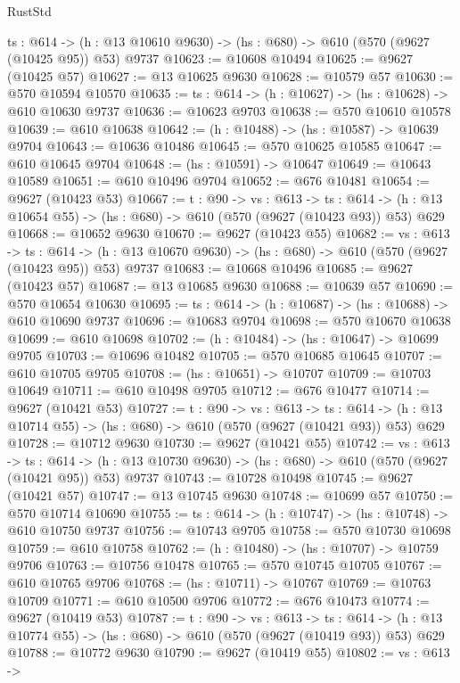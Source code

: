 \begin{lexlean}{RustStd}
\begin{coremodule}
  {ts : @614} -> (h : @13 @10610 @9630) -> (hs : @680) -> @610 (@570 (@9627 (@10425 @95)) @53) @9737
@10623 := @10608 @10494
@10625 := @9627 (@10425 @57)
@10627 := @13 @10625 @9630
@10628 := @10579 @57
@10630 := @570 @10594 @10570
@10635 := {ts : @614} -> (h : @10627) -> (hs : @10628) -> @610 @10630 @9737
@10636 := @10623 @9703
@10638 := @570 @10610 @10578
@10639 := @610 @10638
@10642 := (h : @10488) -> (hs : @10587) -> @10639 @9704
@10643 := @10636 @10486
@10645 := @570 @10625 @10585
@10647 := @610 @10645 @9704
@10648 := (hs : @10591) -> @10647
@10649 := @10643 @10589
@10651 := @610 @10496 @9704
@10652 := @676 @10481
@10654 := @9627 (@10423 @53)
@10667 := {t : @90} ->
  {vs : @613} ->
  {ts : @614} -> (h : @13 @10654 @55) -> (hs : @680) -> @610 (@570 (@9627 (@10423 @93)) @53) @629
@10668 := @10652 @9630
@10670 := @9627 (@10423 @55)
@10682 := {vs : @613} ->
  {ts : @614} -> (h : @13 @10670 @9630) -> (hs : @680) -> @610 (@570 (@9627 (@10423 @95)) @53) @9737
@10683 := @10668 @10496
@10685 := @9627 (@10423 @57)
@10687 := @13 @10685 @9630
@10688 := @10639 @57
@10690 := @570 @10654 @10630
@10695 := {ts : @614} -> (h : @10687) -> (hs : @10688) -> @610 @10690 @9737
@10696 := @10683 @9704
@10698 := @570 @10670 @10638
@10699 := @610 @10698
@10702 := (h : @10484) -> (hs : @10647) -> @10699 @9705
@10703 := @10696 @10482
@10705 := @570 @10685 @10645
@10707 := @610 @10705 @9705
@10708 := (hs : @10651) -> @10707
@10709 := @10703 @10649
@10711 := @610 @10498 @9705
@10712 := @676 @10477
@10714 := @9627 (@10421 @53)
@10727 := {t : @90} ->
  {vs : @613} ->
  {ts : @614} -> (h : @13 @10714 @55) -> (hs : @680) -> @610 (@570 (@9627 (@10421 @93)) @53) @629
@10728 := @10712 @9630
@10730 := @9627 (@10421 @55)
@10742 := {vs : @613} ->
  {ts : @614} -> (h : @13 @10730 @9630) -> (hs : @680) -> @610 (@570 (@9627 (@10421 @95)) @53) @9737
@10743 := @10728 @10498
@10745 := @9627 (@10421 @57)
@10747 := @13 @10745 @9630
@10748 := @10699 @57
@10750 := @570 @10714 @10690
@10755 := {ts : @614} -> (h : @10747) -> (hs : @10748) -> @610 @10750 @9737
@10756 := @10743 @9705
@10758 := @570 @10730 @10698
@10759 := @610 @10758
@10762 := (h : @10480) -> (hs : @10707) -> @10759 @9706
@10763 := @10756 @10478
@10765 := @570 @10745 @10705
@10767 := @610 @10765 @9706
@10768 := (hs : @10711) -> @10767
@10769 := @10763 @10709
@10771 := @610 @10500 @9706
@10772 := @676 @10473
@10774 := @9627 (@10419 @53)
@10787 := {t : @90} ->
  {vs : @613} ->
  {ts : @614} -> (h : @13 @10774 @55) -> (hs : @680) -> @610 (@570 (@9627 (@10419 @93)) @53) @629
@10788 := @10772 @9630
@10790 := @9627 (@10419 @55)
@10802 := {vs : @613} ->

\end{coremodule}
\end{lexlean}
